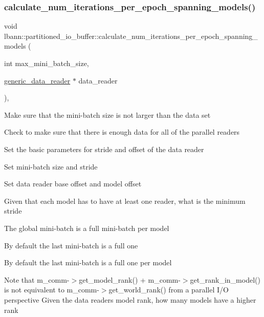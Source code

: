 \mbox{\label{classlbann_1_1partitioned__io__buffer_a50b6e2b7a82927526758f7cfb18a1ded}} 
\subsubsection{\texorpdfstring{calculate\+\_\+num\+\_\+iterations\+\_\+per\+\_\+epoch\+\_\+spanning\+\_\+models()}{calculate\_num\_iterations\_per\_epoch\_spanning\_models()}}
{\footnotesize\ttfamily void lbann\+::partitioned\+\_\+io\+\_\+buffer\+::calculate\+\_\+num\+\_\+iterations\+\_\+per\+\_\+epoch\+\_\+spanning\+\_\+models (\begin{DoxyParamCaption}\item[{int}]{max\+\_\+mini\+\_\+batch\+\_\+size,  }\item[{\hyperlink{classlbann_1_1generic__data__reader}{generic\+\_\+data\+\_\+reader} $\ast$}]{data\+\_\+reader }\end{DoxyParamCaption})\hspace{0.3cm}{\ttfamily [override]}, {\ttfamily [virtual]}}

Make sure that the mini-\/batch size is not larger than the data set

Check to make sure that there is enough data for all of the parallel readers

Set the basic parameters for stride and offset of the data reader

Set mini-\/batch size and stride

Set data reader base offset and model offset

Given that each model has to have at least one reader, what is the minimum stride

The global mini-\/batch is a full mini-\/batch per model

By default the last mini-\/batch is a full one

By default the last mini-\/batch is a full one per model

Note that m\+\_\+comm-\/$>$get\+\_\+model\+\_\+rank() + m\+\_\+comm-\/$>$get\+\_\+rank\+\_\+in\+\_\+model() is not equivalent to m\+\_\+comm-\/$>$get\+\_\+world\+\_\+rank() from a parallel I/O perspective Given the data readers model rank, how many models have a higher rank

